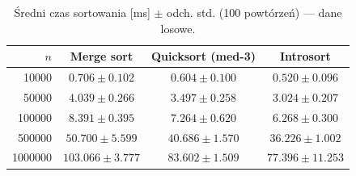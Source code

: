 \begin{table}[H]
\centering
\caption{Średni czas sortowania [ms] $\pm$ odch. std. (100 powtórzeń) — dane losowe.}
\label{tab:summary_random}
\begin{tabular}{rccc}
\toprule
$n$ & Merge sort & Quicksort (med-3) & Introsort \\
\midrule
\num{10000} & $0.706 \pm 0.102$ & $0.604 \pm 0.100$ & $0.520 \pm 0.096$ \\
\num{50000} & $4.039 \pm 0.266$ & $3.497 \pm 0.258$ & $3.024 \pm 0.207$ \\
\num{100000} & $8.391 \pm 0.395$ & $7.264 \pm 0.620$ & $6.268 \pm 0.300$ \\
\num{500000} & $50.700 \pm 5.599$ & $40.686 \pm 1.570$ & $36.226 \pm 1.002$ \\
\num{1000000} & $103.066 \pm 3.777$ & $83.602 \pm 1.509$ & $77.396 \pm 11.253$ \\
\bottomrule
\end{tabular}
\end{table}
